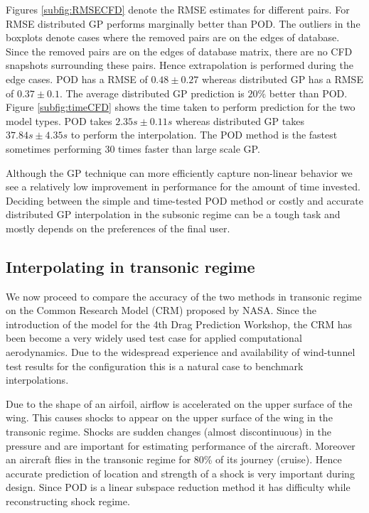 Figures \ref{subfig:RMSECFD} denote the RMSE estimates for different pairs. For RMSE distributed GP performs marginally better than POD. The outliers in the boxplots denote cases where the removed pairs are on the edges of database. Since the removed pairs are on the edges of database matrix, there are no CFD snapshots surrounding these pairs. Hence extrapolation is performed during the edge cases. POD has a RMSE of \(0.48\pm0.27\) whereas distributed GP has a RMSE of \(0.37\pm0.1\). The average distributed GP prediction is \(20\%\) better than POD. Figure \ref{subfig:timeCFD} shows the time taken to perform prediction for the two model types. POD takes \(2.35s\pm0.11s\) whereas distributed GP takes \(37.84s\pm4.35s\) to perform the interpolation. The POD method is the fastest sometimes performing 30 times faster than large scale GP. 

Although the GP technique can more efficiently capture non-linear behavior we see a relatively low improvement in performance for the amount of time invested. Deciding between the simple and time-tested POD method or costly and accurate distributed GP interpolation in the subsonic regime can be a tough task and mostly depends on the preferences of the final user.

\subsection{Interpolating in transonic regime}\label{subSec:resultsCRM}
We now proceed to compare the accuracy of the two methods in transonic regime on the Common Research Model (CRM)  proposed by NASA. Since the introduction of the model for the 4th Drag Prediction Workshop, the CRM has been become a very widely used test case for applied computational aerodynamics. Due to the widespread experience and availability of wind-tunnel test results for the configuration this is a natural case to benchmark interpolations. 

Due to the shape of an airfoil, airflow is accelerated on the upper surface of the wing. This causes shocks to appear on the upper surface of the wing in the transonic regime. Shocks are sudden changes (almost discontinuous) in the pressure and are important for estimating performance of the aircraft. Moreover an aircraft flies in the transonic regime for 80\% of its journey (cruise). Hence accurate prediction of location and strength of a shock is very important during design. Since POD is a linear subspace reduction method it has difficulty while reconstructing shock regime.

